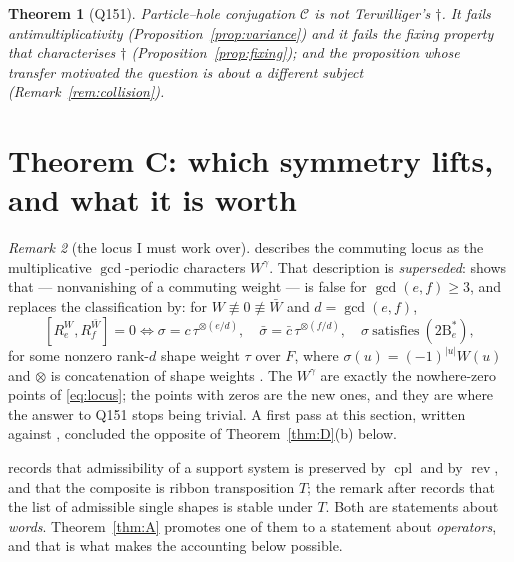 \documentclass[11pt]{article}
\newtheorem{theorem}{Theorem}[section]
\theoremstyle{definition}
\theoremstyle{remark}
\newtheorem{remark}[theorem]{Remark}
\newcommand{\Cop}{\mathcal{C}}
\newcommand{\rev}{\operatorname{rev}}
\newcommand{\cpl}{\operatorname{cpl}}
\begin{document}
\begin{theorem}[Q151]\label{thm:Q151}
Particle--hole conjugation $\Cop$ is not Terwilliger's $\dagger$.  It fails
antimultiplicativity (Proposition~\ref{prop:variance}) and it fails the fixing property
that characterises $\dagger$ (Proposition~\ref{prop:fixing}); and the proposition whose
transfer motivated the question is about a different subject
(Remark~\ref{rem:collision}).
\end{theorem}

\section{Theorem C: which symmetry lifts, and what it is worth}

\begin{remark}[the locus I must work over]\label{rem:which}
\cite[Thm.~\texttt{thm:main}]{Q149} describes the commuting locus as the multiplicative
$\gcd$-periodic characters $W^{\gamma}$.  That description is \emph{superseded}:
\cite[Cor.~\texttt{cor:main0}]{Q150c1} shows that \cite[Lem.~8.2]{Q149} --- nonvanishing of a
commuting weight --- is false for $\gcd(e,f)\ge3$, and
\cite[Thm.~\texttt{thm:main0}]{Q150c1} replaces the classification by: for
$W\not\equiv0\not\equiv\bar W$ and $d=\gcd(e,f)$,
\begin{equation}\label{eq:locus}
   [R_e^{W},R_f^{\bar W}]=0\iff
   \sigma=c\,\tau^{\otimes(e/d)},\quad \bar\sigma=\bar c\,\tau^{\otimes(f/d)},\quad
   \sigma\ \text{satisfies}\ (2\mathrm{B}^{*}_e),
\end{equation}
for some nonzero rank-$d$ shape weight $\tau$ over $F$, where $\sigma(u)=(-1)^{|u|}W(u)$ and
$\otimes$ is concatenation of shape weights \cite[Conv.~\texttt{conv:otimes}]{Q150c1}.  The
$W^{\gamma}$ are exactly the nowhere-zero points of \eqref{eq:locus}; the points with zeros
are the new ones, and they are where the answer to Q151 stops being trivial.  A first pass at
this section, written against \cite[Thm.~\texttt{thm:main}]{Q149}, concluded the opposite of
Theorem~\ref{thm:D}(b) below.
\end{remark}

\cite[Rem.~\texttt{rem:sym}]{Q150c2} records that admissibility of a support system is
preserved by $\cpl$ and by $\rev$, and that the composite is ribbon transposition $T$; the
remark after \cite[Cor.~\texttt{cor:48}]{Q150c2} records that the list of admissible single
shapes is stable under $T$.  Both are statements about \emph{words}.  Theorem~\ref{thm:A}
promotes one of them to a statement about \emph{operators}, and that is what makes the
accounting below possible.
\end{document}
